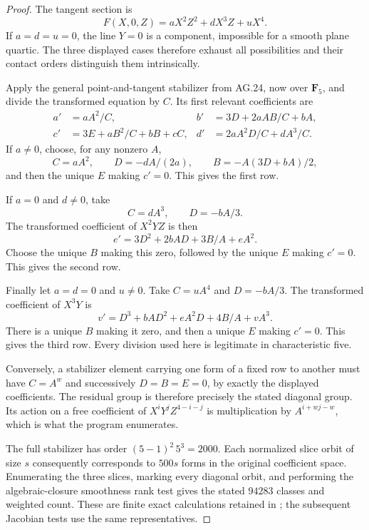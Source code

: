 \begin{proof}
The tangent section is
\[
                  F(X,0,Z)=aX^2Z^2+dX^3Z+uX^4.
\]
If $a=d=u=0$, the line $Y=0$ is a component, impossible
for a smooth plane quartic. The three displayed cases
therefore exhaust all possibilities and their contact
orders distinguish them intrinsically.

Apply the general point-and-tangent stabilizer from AG.24,
now over $\mathbf F_5$, and divide the transformed equation
by $C$. Its first relevant coefficients are
\[
 \begin{aligned}
 a'&=aA^2/C,&
 b'&=3D+2aAB/C+bA,\\
 c'&=3E+aB^2/C+bB+cC,&
 d'&=2aA^2D/C+dA^3/C.
 \end{aligned}                                                \tag{AG.25.1}
\]
If $a\ne0$, choose, for any nonzero $A$,
\[
 C=aA^2,\qquad D=-dA/(2a),\qquad
 B=-A(3D+bA)/2,
\]
and then the unique $E$ making $c'=0$. This gives
the first row.

If $a=0$ and $d\ne0$, take
\[
 C=dA^3,\qquad D=-bA/3.
\]
The transformed coefficient of $X^2YZ$ is then
\[
                   e'=3D^2+2bAD+3B/A+eA^2.
\]
Choose the unique $B$ making this zero, followed by
the unique $E$ making $c'=0$. This gives the second row.

Finally let $a=d=0$ and $u\ne0$. Take
$C=uA^4$ and $D=-bA/3$. The transformed coefficient
of $X^3Y$ is
\[
                 v'=D^3+bAD^2+eA^2D+4B/A+vA^3.
\]
There is a unique $B$ making it zero, and then a unique
$E$ making $c'=0$. This gives the third row. Every
division used here is legitimate in characteristic five.

Conversely, a stabilizer element carrying one form of a
fixed row to another must have $C=A^w$ and successively
$D=B=E=0$, by exactly the displayed coefficients.
The residual group is therefore precisely the stated
diagonal group. Its action on a free coefficient of
$X^iY^jZ^{4-i-j}$ is multiplication by
$A^{i+wj-w}$, which is what the program enumerates.

The full stabilizer has order
$(5-1)^2\,5^3=2000$. Each normalized slice orbit
of size $s$ consequently corresponds to $500s$
forms in the original coefficient space. Enumerating
the three slices, marking every diagonal orbit, and
performing the algebraic-closure smoothness rank test
gives the stated $94283$ classes and weighted count.
These are finite exact calculations retained in
; the subsequent
Jacobian tests use the same representatives.
\end{proof}


